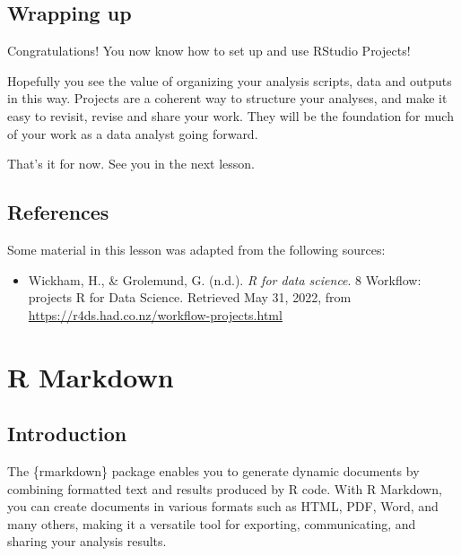 \documentclass[
  letterpaper,
  DIV=11,
  numbers=noendperiod]{scrreprt}
\providecommand{\tightlist}{%
  \setlength{\itemsep}{0pt}\setlength{\parskip}{0pt}}\usepackage{longtable,booktabs,array}
\begin{document}
\hypertarget{wrapping-up-3}{%
\section{Wrapping up}\label{wrapping-up-3}}

Congratulations! You now know how to set up and use RStudio Projects!

Hopefully you see the value of organizing your analysis scripts, data
and outputs in this way. Projects are a coherent way to structure your
analyses, and make it easy to revisit, revise and share your work. They
will be the foundation for much of your work as a data analyst going
forward.

That's it for now. See you in the next lesson.

\hypertarget{references-5}{%
\section*{References}\label{references-5}}


Some material in this lesson was adapted from the following sources:

\begin{itemize}
\tightlist
\item
  Wickham, H., \& Grolemund, G. (n.d.). \emph{R for data science}. 8
  Workflow: projects \textbar{} R for Data Science. Retrieved May 31,
  2022, from \url{https://r4ds.had.co.nz/workflow-projects.html}
\end{itemize}


\hypertarget{r-markdown}{%
\chapter{R Markdown}\label{r-markdown}}

\hypertarget{introduction-7}{%
\section{Introduction}\label{introduction-7}}

The \{rmarkdown\} package enables you to generate dynamic documents by
combining formatted text and results produced by R code. With R
Markdown, you can create documents in various formats such as HTML, PDF,
Word, and many others, making it a versatile tool for exporting,
communicating, and sharing your analysis results.
\end{document}
